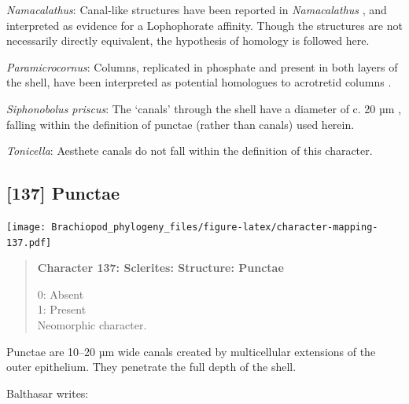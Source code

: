\documentclass[openany]{book}
\begin{document}
\hypertarget{Namacalathus-coding-136}{}
\emph{Namacalathus}: Canal-like structures have been reported in
\emph{Namacalathus} \citep{Zhuravlev2015Ediacaranskeletal}, and
interpreted as evidence for a Lophophorate affinity. Though the
structures are not necessarily directly equivalent, the hypothesis of
homology is followed here.

\hypertarget{Paramicrocornus-coding-136}{}
\emph{Paramicrocornus}: Columns, replicated in phosphate and present in
both layers of the shell, have been interpreted as potential homologues
to acrotretid columns \citep{Zhang2018Ahyolithid}.

\hypertarget{Siphonobolus_priscus-coding-136}{}
\emph{Siphonobolus priscus}: The `canals' through the shell have a
diameter of c. 20 µm \citep[text-fig. 2a]{Williams2004Chemicostructure},
falling within the definition of punctae (rather than canals) used
herein.

\hypertarget{Tonicella-coding-136}{}
\emph{Tonicella}: Aesthete canals do not fall within the definition of
this character.

\subsection*{{[}137{]} Punctae}\label{punctae}

\texttt{[image: Brachiopod\_phylogeny\_files/figure-latex/character-mapping-137.pdf]}

\begin{quote}
\textbf{Character 137: Sclerites: Structure: Punctae}

0: Absent\\
1: Present\\
Neomorphic character.
\end{quote}

Punctae are 10--20 µm wide canals created by multicellular extensions of
the outer epithelium. They penetrate the full depth of the shell.

Balthasar \citeyearpar{Balthasar2008iMummpikia} writes:
\end{document}
